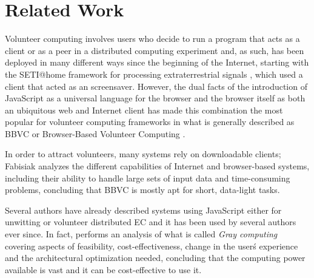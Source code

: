 \documentclass{llncs}
\begin{document}
\section{Related Work}
\label{sec:soa}

Volunteer computing involves users who decide to run a program that acts
as a client or as a peer in a distributed computing experiment
and, as such, has been deployed in many different ways since the
beginning of the Internet, starting with the SETI@home framework for
processing extraterrestrial signals \cite{david-seti:home}, which used
a client that acted as an screensaver.%
However,
the dual facts of the introduction of JavaScript as a universal language for the
browser and the browser itself as both an ubiquitous web and Internet client has
made this combination the most popular for volunteer computing
frameworks in what is generally described as BBVC or Browser-Based
Volunteer Computing \cite{fabisiak2017browser}.


In order to attract volunteers, many systems rely on downloadable clients;
Fabisiak \cite{fabisiak2017browser}
analyzes the different capabilities of Internet and browser-based
systems, including their ability to handle large sets of input data
and time-consuming problems, concluding that BBVC is mostly apt for
short, data-light tasks.

Several authors have already described systems using JavaScript either
for unwitting
\cite{unwitting-ec,boldrin2007distributed,apolonia2012enhancing} or volunteer
\cite{langdon:2005:metas,gecco07:workshop:dcor} distributed EC and it has been used by several
authors ever since. In
fact, \cite{pan2015gray} performs an analysis of what
is called {\em Gray computing} covering aspects of 
feasibility, cost-effectiveness, change in the user\'s experience and the
architectural optimization needed, concluding that the computing power
available is vast and it can be cost-effective to use it.
\end{document}

